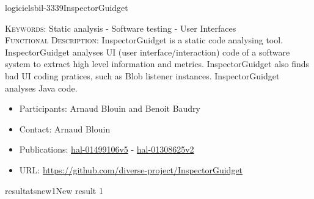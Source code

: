 \documentclass{ra2018}
\begin{document}
 \begin{module}{logiciels}{bil-3339}{InspectorGuidget}

   \textsc{Keywords:} Static analysis - Software testing - User Interfaces \\ 


   

 \textsc{Functional Description:}  InspectorGuidget is a static code analysing tool. InspectorGuidget analyses UI (user interface/interaction) code  of a software system to extract high level information and metrics. InspectorGuidget also finds bad UI coding pratices, such as Blob listener instances. InspectorGuidget analyses Java code.\\

   \begin{itemize}
      \item Participants: Arnaud Blouin and Benoit Baudry
      \item Contact: Arnaud Blouin
      \item Publications: \href{https://hal.inria.fr/hal-01499106v5}{hal-01499106v5} - 
 \href{https://hal.inria.fr/hal-01308625v2}{hal-01308625v2}
      \item URL: \url{https://github.com/diverse-project/InspectorGuidget}
   \end{itemize}

 \end{module}





\begin{module}{resultats}{new1}{New result 1}
\end{module}





\end{document}

